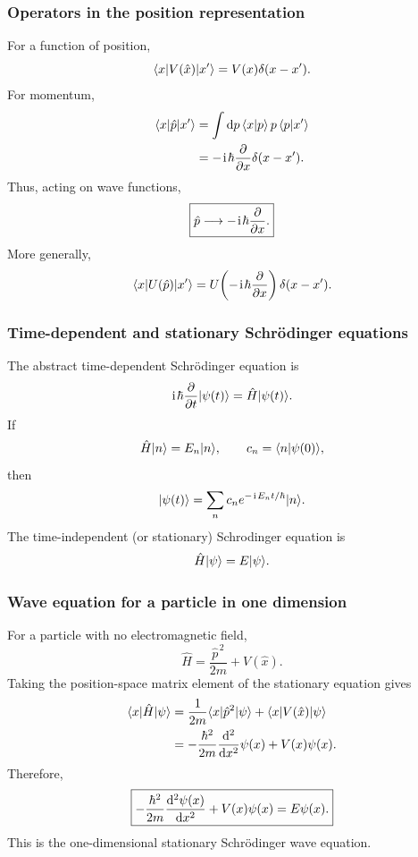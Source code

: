 \subsubsection{Operators in the position representation}
For a function of position,
\begin{equation}
 \langle{x}|V(\hat{x})|{x'}\rangle=V(x)\delta(x-x').
\end{equation}
For momentum,
\begin{align}
 \langle{x}|\hat{p}|{x'}\rangle
 &=\int\mathrm{d} p\,\langle{x|p}\rangle\,p\,\langle{p|x'}\rangle\\
 &=-\hspace{1pt}\mathrm{i}\hspace{1pt}\hbar\frac{\partial}{\partial x}\delta(x-x').
\end{align}
Thus, acting on wave functions,
\begin{equation}
 \boxed{\hat{p}\longrightarrow-\hspace{1pt}\mathrm{i}\hspace{1pt}\hbar\frac{\partial}{\partial x}.}
\end{equation}
More generally,
\begin{equation}
 \langle{x}|U(\hat{p})|{x'}\rangle
 =U\!\left(-\hspace{1pt}\mathrm{i}\hspace{1pt}\hbar\frac{\partial}{\partial x}\right)\delta(x-x').
\end{equation}

\subsubsection{Time-dependent and stationary Schr\"odinger equations}
The abstract time-dependent Schr\"odinger equation is
\begin{equation}
 \hspace{1pt}\mathrm{i}\hspace{1pt}\hbar\frac{\partial}{\partial t}|{\psi(t)}\rangle
 =\hat{H}|{\psi(t)}\rangle.
\end{equation}
If
\begin{equation}
 \hat{H}|{n}\rangle=E_n|{n}\rangle,
 \qquad
 c_n=\langle{n|\psi(0)}\rangle,
\end{equation}
then
\begin{equation}
 |{\psi(t)}\rangle=\sum_n c_n e^{-\hspace{1pt}\mathrm{i}\hspace{1pt} E_nt/\hbar}|{n}\rangle.
\end{equation}
The time-independent (or stationary) Schrodinger equation is
\begin{equation}
 \hat{H}|{\psi}\rangle=E|{\psi}\rangle.
\end{equation}

\subsubsection{Wave equation for a particle in one dimension}
For a particle with no electromagnetic field,
\begin{equation}
 \hat{H}=\frac{\hat{p}^{\,2}}{2m}+V(\hat{x}).
\end{equation}
Taking the position-space matrix element of the stationary equation gives
\begin{align}
 \langle{x}|\hat{H}|{\psi}\rangle
 &=\frac{1}{2m}\langle{x}|\hat{p}^{2}|{\psi}\rangle
 +\langle{x}|V(\hat{x})|{\psi}\rangle\\
 &=-\frac{\hbar^2}{2m}\frac{\mathrm{d}{}^2}{\mathrm{d} x^2}\psi(x)
 +V(x)\psi(x).
\end{align}
Therefore,
\begin{equation}
 \boxed{-\frac{\hbar^2}{2m}\frac{\mathrm{d}{}^2\psi(x)}{\mathrm{d}{x^2}}
 +V(x)\psi(x)=E\psi(x).}
\end{equation}
This is the one-dimensional stationary Schr\"odinger wave equation.

